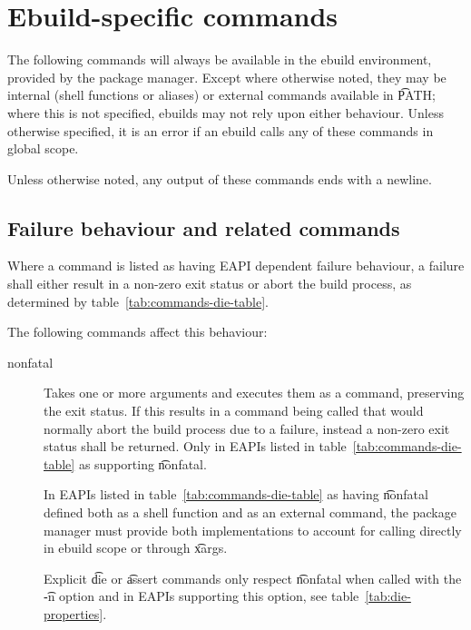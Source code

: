 \section{Ebuild-specific commands}
\label{sec:pkg-mgr-commands}

The following commands will always be available in the ebuild environment, provided by the package
manager. Except where otherwise noted, they may be internal (shell functions or aliases) or external
commands available in \t{PATH}; where this is not specified, ebuilds may not rely upon either
behaviour. Unless otherwise specified, it is an error if an ebuild calls any of these commands in
global scope.

Unless otherwise noted, any output of these commands ends with a newline.

\subsection{Failure behaviour and related commands}
\label{sec:failure-behaviour}

 Where a command is listed as having EAPI dependent failure behaviour,
a failure shall either result in a non-zero exit status or abort the build process, as determined by
table~\ref{tab:commands-die-table}.

The following commands affect this behaviour:
\nobreakpar
\begin{description}
\item[nonfatal]  Takes one or more arguments and executes them as a command,
    preserving the exit status. If this results in a command being called that would normally abort
    the build process due to a failure, instead a non-zero exit status shall be returned. Only in
    EAPIs listed in table~\ref{tab:commands-die-table} as supporting \t{nonfatal}.

    In EAPIs listed in table~\ref{tab:commands-die-table} as having \t{nonfatal} defined both
    as a shell function and as an external command, the package manager must provide both
    implementations to account for calling directly in ebuild scope or through \t{xargs}.

    Explicit \t{die} or \t{assert} commands only respect \t{nonfatal} when called with the \t{-n}
    option and in EAPIs supporting this option, see table~\ref{tab:die-properties}.
\end{description}

